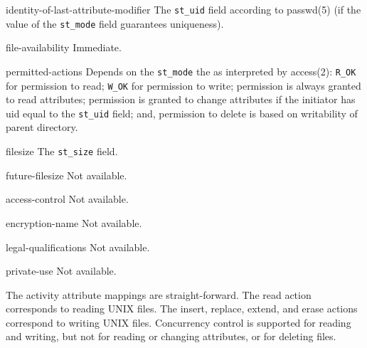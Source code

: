 \begin{describe}
\item[identity-of-last-attribute-modifier]
The \verb"st_uid" field according to \man passwd(5)
(if the value of the \verb"st_mode" field guarantees uniqueness).

\item[file-availability]
Immediate.

\item[permitted-actions]
Depends on the \verb"st_mode" the as interpreted by \man access(2):
\verb"R_OK" for permission to read;
\verb"W_OK" for permission to write;
permission is always granted to read attributes;
permission is granted to change attributes if the initiator has uid equal to
the \verb"st_uid" field;
and,
permission to delete is based on writability of parent directory.

\item[filesize]
The \verb"st_size" field.

\item[future-filesize]
Not available.

\item[access-control]
Not available.

\item[encryption-name]
Not available.

\item[legal-qualifications]
Not available.

\item[private-use]
Not available.
\end{describe}

The activity attribute mappings are straight-forward.
The read action corresponds to reading UNIX files.
The insert, replace, extend, and erase actions correspond to writing
UNIX files.
Concurrency control is supported for reading and writing,
but not for reading or changing attributes, or for deleting files.
